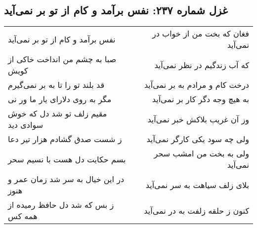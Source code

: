 \begin{center}
\section*{غزل شماره ۲۳۷: نفس برآمد و کام از تو بر نمی‌آید}
\label{sec:sh237}
\begin{longtable}{l p{0.5cm} r}
نفس برآمد و کام از تو بر نمی‌آید
&&
فغان که بخت من از خواب در نمی‌آید
\\
صبا به چشم من انداخت خاکی از کویش
&&
که آب زندگیم در نظر نمی‌آید
\\
قد بلند تو را تا به بر نمی‌گیرم
&&
درخت کام و مرادم به بر نمی‌آید
\\
مگر به روی دلارای یار ما ور نی
&&
به هیچ وجه دگر کار بر نمی‌آید
\\
مقیم زلف تو شد دل که خوش سوادی دید
&&
وز آن غریب بلاکش خبر نمی‌آید
\\
ز شست صدق گشادم هزار تیر دعا
&&
ولی چه سود یکی کارگر نمی‌آید
\\
بسم حکایت دل هست با نسیم سحر
&&
ولی به بخت من امشب سحر نمی‌آید
\\
در این خیال به سر شد زمان عمر و هنوز
&&
بلای زلف سیاهت به سر نمی‌آید
\\
ز بس که شد دل حافظ رمیده از همه کس
&&
کنون ز حلقه زلفت به در نمی‌آید
\\
\end{longtable}
\end{center}

